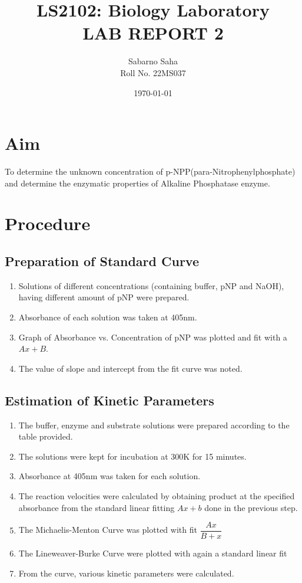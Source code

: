 \documentclass[12pt]{article}
\theoremstyle{definition}
\theoremstyle{definition}
\theoremstyle{remark}
\begin{document}
\title{LS2102: Biology Laboratory \\[2ex] LAB REPORT 2}
\author{Sabarno Saha \\Roll No. 22MS037}
\date{\today}

\maketitle
\tableofcontents
\newpage
\section{Aim}
To determine the unknown concentration of p-NPP(para-Nitrophenylphosphate) and determine the enzymatic properties of Alkaline Phosphatase enzyme.
\section{Procedure}
\subsection{Preparation of Standard Curve}
\begin{enumerate}
    \item Solutions of different concentrations (containing buffer, pNP and NaOH), having
different amount of pNP were prepared.
\item  Absorbance of each solution was taken at 405nm.
\item Graph of Absorbance vs. Concentration of pNP was plotted and fit with a $Ax+B$.
\item The value of slope and intercept from the fit curve was noted.
\end{enumerate}

\subsection{Estimation of Kinetic Parameters}
\begin{enumerate}
    \item The buffer, enzyme and substrate solutions were prepared according to the table
provided.
\item  The solutions were kept for incubation at 300K for 15 minutes.
\item  Absorbance at 405nm was taken for each solution.
\item The reaction velocities were calculated by obtaining product at the specified absorbance from the standard linear fitting $Ax+b$ done in the previous step.
\item The Michaelis-Menton Curve was plotted with fit $\dfrac{Ax}{B+x}$
\item The Lineweaver-Burke Curve were plotted with again a standard linear fit
\item From the curve, various kinetic parameters were calculated.
\end{enumerate} 
\end{document}
